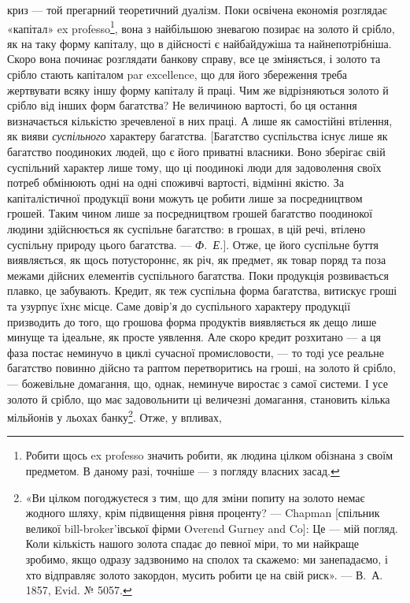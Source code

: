 \parcont{}  %
криз — той прегарний теоретичний дуалізм. Поки освічена економія розглядає
«капітал» ex professo\footnote{Робити щось ex professo значить робити, як людина цілком обізнана з своїм предметом. В даному
разі, точніше — з погляду власних засад. }, вона з найбільшою зневагою позирає на золото й срібло,
як на таку форму капіталу, що в дійсності є найбайдужіша та найнепотрібніша.
Скоро вона починає розглядати банкову справу, все це зміняється, і золото та
срібло стають капіталом par excellence, що для його збереження треба жертвувати
всяку іншу форму капіталу й праці. Чим же відрізняються золото й
срібло від інших форм багатства? Не величиною вартості, бо ця остання визначається
кількістю зречевленої в них праці. А лише як самостійні втілення, як вияви
\emph{суспільного} характеру багатства. [Багатство суспільства існує лише як багатство
поодиноких людей, що є його приватні власники. Воно зберігає свій суспільний
характер лише тому, що ці поодинокі люди для задоволення своїх потреб
обмінюють одні на одні споживчі вартості, відмінні якістю. За капіталістичної
продукції вони можуть це робити лише за посредництвом грошей. Таким
чином лише за посредництвом грошей багатство поодинокої людини здійснюється як
суспільне багатство: в грошах, в цій речі, втілено суспільну природу цього багатства.
— \emph{Ф.~Е.}]. Отже, це його суспільне буття виявляється, як щось потустороннє,
як річ, як предмет, як товар поряд та поза межами дійсних елементів суспільного
багатства. Поки продукція розвивається плавко, це забувають. Кредит, як теж
суспільна форма багатства, витискує гроші та узурпує їхнє місце. Саме довір’я
до суспільного характеру продукції призводить до того, що грошова форма продуктів
виявляється як дещо лише минуще та ідеальне, як просте уявлення. Але
скоро кредит розхитано — а ця фаза постає неминучо в циклі сучасної промисловости,
— то тоді усе реальне багатство повинно дійсно та раптом перетворитись
на гроші, на золото й срібло, — божевільне домагання, що, однак, неминуче виростає
з самої системи. І усе золото й срібло, що має задовольнити ці величезні
домагання, становить кілька мільйонів у льохах банку\footnote{
«Ви цілком погоджуєтеся з тим, що для зміни попиту на золото немає жодного шляху, крім
підвищення
рівня проценту? — Chapman [спільник великої bill-broker’івської фірми Overend Gurney and Co]:
Це — мій погляд. Коли кількість нашого золота спадає до певної міри, то ми найкраще зробимо, якщо
одразу задзвонимо на сполох та скажемо: ми занепадаємо, і хто відправляє золото закордон, мусить
робити це на свій риск». — В.~А. 1857, Evid. № 5057.
}. Отже, у впливах,
